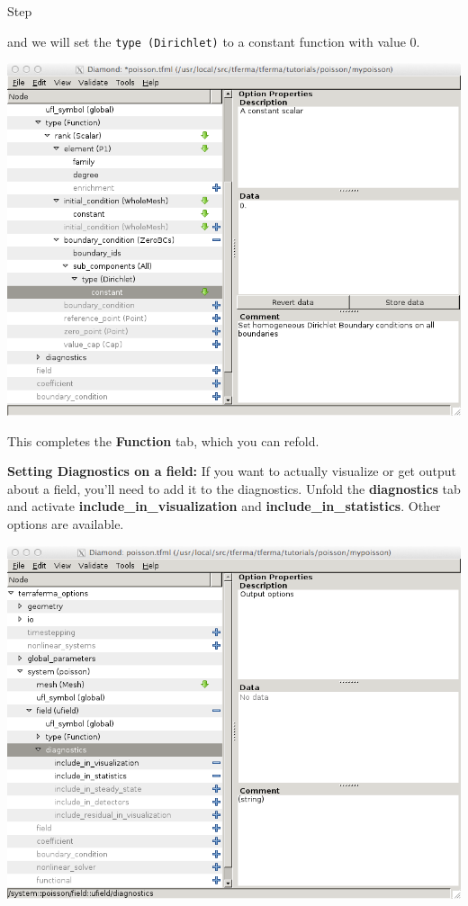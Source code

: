 \begin{steps}{Step}
\begin{center}
\end{center}
and we will set the \texttt{type (Dirichlet)} to a constant function
with value 0.
\begin{center}
    \includegraphics[width=\diamondwidth]{figures/screendumps/diamond_poisson_08d.png}
\end{center}
This completes the \textbf{Function} tab, which you can refold.
\item \textbf{Setting Diagnostics on a field:}  If you want to actually visualize
  or get output about a field, you'll need to add it to the
  diagnostics.  Unfold the \textbf{diagnostics} tab and activate
  \textbf{include\_in\_visualization} and
  \textbf{include\_in\_statistics}. Other options are available.
\begin{center}
    \includegraphics[width=\diamondwidth]{figures/screendumps/diamond_poisson_09.png}

\end{center}
\end{steps}
